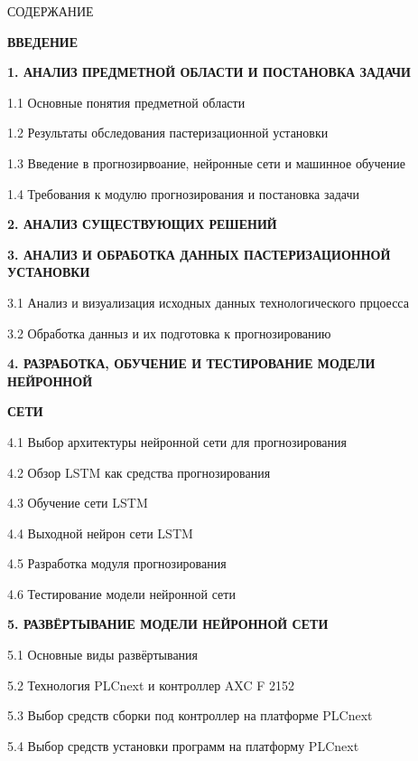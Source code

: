 {\gostTitleFont
    \redline
    СОДЕРЖАНИЕ
} 

\titlespace

{\gostFont

    \par {\bfseries ВВЕДЕНИЕ }
    \par {\bfseries 1. АНАЛИЗ ПРЕДМЕТНОЙ ОБЛАСТИ И ПОСТАНОВКА ЗАДАЧИ }
    \par 1.1 Основные понятия предметной области 
    \par 1.2 Результаты обследования пастеризационной установки  
    \par 1.3 Введение в прогнозирвоание, нейронные сети и машинное обучение  
    \par 1.4 Требования к модулю прогнозирования и постановка задачи  
    \par {\bfseries 2. АНАЛИЗ СУЩЕСТВУЮЩИХ РЕШЕНИЙ }
    \par {\bfseries 3. АНАЛИЗ И ОБРАБОТКА ДАННЫХ ПАСТЕРИЗАЦИОННОЙ УСТАНОВКИ }
    \par 3.1 Анализ и визуализация исходных данных технологического прцоесса 
    \par 3.2 Обработка данныз и их подготовка к прогнозированию 
    \par {\bfseries 4. РАЗРАБОТКА, ОБУЧЕНИЕ И ТЕСТИРОВАНИЕ МОДЕЛИ НЕЙРОННОЙ}
    \par {\bfseries СЕТИ }
    \par 4.1 Выбор архитектуры нейронной сети для прогнозирования 
    \par 4.2 Обзор LSTM как средства прогнозирования 
    \par 4.3 Обучение сети LSTM 
    \par 4.4 Выходной нейрон сети LSTM 
    \par 4.5 Разработка модуля прогнозирования 
    \par 4.6 Тестирование модели нейронной сети 
    \par {\bfseries 5. РАЗВЁРТЫВАНИЕ МОДЕЛИ НЕЙРОННОЙ СЕТИ }
    \par 5.1 Основные виды развёртывания 
    \par 5.2 Технология PLCnext и контроллер AXC F 2152 
    \par 5.3 Выбор средств сборки под контроллер на платформе PLCnext 
    \par 5.4 Выбор средств установки программ на платформу PLCnext 
}
